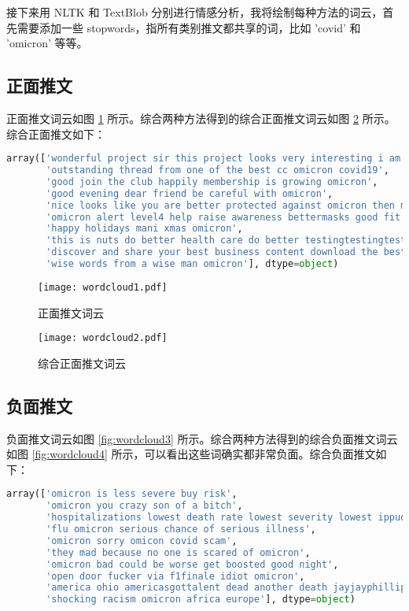 \documentclass[12pt,AutoFakeBold]{article}
\begin{document}
接下来用 NLTK 和 TextBlob 分别进行情感分析，我将绘制每种方法的词云，首先需要添加一些 stopwords，指所有类别推文都共享的词，比如 'covid' 和 'omicron' 等等。

\subsection{正面推文}

正面推文词云如图 \ref{fig:wordcloud1} 所示。综合两种方法得到的综合正面推文词云如图 \ref{fig:wordcloud2} 所示。综合正面推文如下：

\begin{lstlisting}[language=Python]
array(['wonderful project sir this project looks very interesting i am interested and i will support this',
       'outstanding thread from one of the best cc omicron covid19',
       'good join the club happily membership is growing omicron',
       'good evening dear friend be careful with omicron',
       'nice looks like you are better protected against omicron then me',
       'omicron alert level4 help raise awareness bettermasks good fit amp filtration is key ffp2 cloth mask good fit over',
       'happy holidays mani xmas omicron',
       'this is nuts do better health care do better testingtestingtesting covid19 omicron',
       'discover and share your best business content download the best app gt theeconomist',
       'wise words from a wise man omicron'], dtype=object)
\end{lstlisting}

\begin{figure}[htbp]
	\centering
    \texttt{[image: wordcloud1.pdf]}
    \caption{正面推文词云} \label{fig:wordcloud1}
\end{figure}

\begin{figure}[htbp]
	\centering
    \texttt{[image: wordcloud2.pdf]}
    \caption{综合正面推文词云} \label{fig:wordcloud2}
\end{figure}

\subsection{负面推文}

负面推文词云如图 \ref{fig:wordcloud3} 所示。综合两种方法得到的综合负面推文词云如图 \ref{fig:wordcloud4} 所示，可以看出这些词确实都非常负面。综合负面推文如下：

\begin{lstlisting}[language=Python]
array(['omicron is less severe buy risk',
       'omicron you crazy son of a bitch',
       'hospitalizations lowest death rate lowest severity lowest ippudanna aa fear mongering aapesi lock down l',
       'flu omicron serious chance of serious illness',
       'omicron sorry omicon covid scam',
       'they mad because no one is scared of omicron',
       'omicron bad could be worse get boosted good night',
       'open door fucker via f1finale idiot omicron',
       'america ohio americasgottalent dead another death jayjayphillips was discovered dead',
       'shocking racism omicron africa europe'], dtype=object)
\end{lstlisting}
\end{document}
